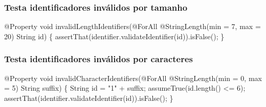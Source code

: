 \documentclass[
  letterpaper,
  DIV=11,
  numbers=noendperiod]{scrartcl}
\newenvironment{Shaded}{\begin{snugshade}}{\end{snugshade}}
\newcommand{\AttributeTok}[1]{\textcolor[rgb]{0.40,0.45,0.13}{#1}}
\newcommand{\BuiltInTok}[1]{\textcolor[rgb]{0.00,0.23,0.31}{#1}}
\newcommand{\DataTypeTok}[1]{\textcolor[rgb]{0.68,0.00,0.00}{#1}}
\newcommand{\DecValTok}[1]{\textcolor[rgb]{0.68,0.00,0.00}{#1}}
\newcommand{\FunctionTok}[1]{\textcolor[rgb]{0.28,0.35,0.67}{#1}}
\newcommand{\NormalTok}[1]{\textcolor[rgb]{0.00,0.23,0.31}{#1}}
\newcommand{\OperatorTok}[1]{\textcolor[rgb]{0.37,0.37,0.37}{#1}}
\newcommand{\StringTok}[1]{\textcolor[rgb]{0.13,0.47,0.30}{#1}}
\begin{document}
\subsubsection{\texorpdfstring{\textbf{Testa identificadores inválidos
por
tamanho}}{Testa identificadores inválidos por tamanho}}\label{testa-identificadores-invuxe1lidos-por-tamanho}

\begin{Shaded}
\begin{Highlighting}[]
\AttributeTok{@Property}
\DataTypeTok{void} \FunctionTok{invalidLengthIdentifiers}\OperatorTok{(}\AttributeTok{@ForAll} \AttributeTok{@StringLength}\OperatorTok{(}\NormalTok{min }\OperatorTok{=} \DecValTok{7}\OperatorTok{,}\NormalTok{ max }\OperatorTok{=} \DecValTok{20}\OperatorTok{)} \BuiltInTok{String}\NormalTok{ id}\OperatorTok{)} \OperatorTok{\{}
    \FunctionTok{assertThat}\OperatorTok{(}\NormalTok{identifier}\OperatorTok{.}\FunctionTok{validateIdentifier}\OperatorTok{(}\NormalTok{id}\OperatorTok{)).}\FunctionTok{isFalse}\OperatorTok{();}
\OperatorTok{\}}
\end{Highlighting}
\end{Shaded}

\subsubsection{\texorpdfstring{\textbf{Testa identificadores inválidos
por
caracteres}}{Testa identificadores inválidos por caracteres}}\label{testa-identificadores-invuxe1lidos-por-caracteres}

\begin{Shaded}
\begin{Highlighting}[]
\AttributeTok{@Property}
\DataTypeTok{void} \FunctionTok{invalidCharacterIdentifiers}\OperatorTok{(}\AttributeTok{@ForAll} \AttributeTok{@StringLength}\OperatorTok{(}\NormalTok{min }\OperatorTok{=} \DecValTok{0}\OperatorTok{,}\NormalTok{ max }\OperatorTok{=} \DecValTok{5}\OperatorTok{)} \BuiltInTok{String}\NormalTok{ suffix}\OperatorTok{)} \OperatorTok{\{}
    \BuiltInTok{String}\NormalTok{ id }\OperatorTok{=} \StringTok{"1"} \OperatorTok{+}\NormalTok{ suffix}\OperatorTok{;}
    \FunctionTok{assumeTrue}\OperatorTok{(}\NormalTok{id}\OperatorTok{.}\FunctionTok{length}\OperatorTok{()} \OperatorTok{\textless{}=} \DecValTok{6}\OperatorTok{);}
    \FunctionTok{assertThat}\OperatorTok{(}\NormalTok{identifier}\OperatorTok{.}\FunctionTok{validateIdentifier}\OperatorTok{(}\NormalTok{id}\OperatorTok{)).}\FunctionTok{isFalse}\OperatorTok{();}
\OperatorTok{\}}
\end{Highlighting}
\end{Shaded}
\end{document}
